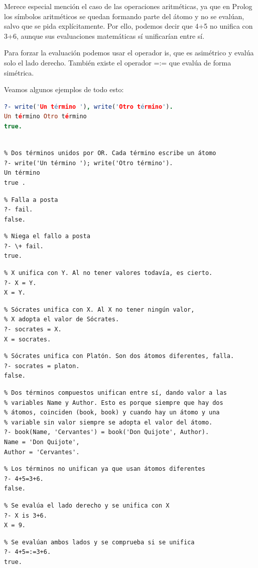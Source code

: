 \documentclass[openright,twoside,12pt]{book}
\begin{document}
Merece especial mención el caso de las operaciones aritméticas, ya que en Prolog los símbolos aritméticos se quedan formando parte del átomo y no se evalúan, salvo que se pida explícitamente. Por ello, podemos decir que 4+5 no unifica con 3+6, aunque sus evaluaciones matemáticas sí unificarían entre sí.

Para forzar la evaluación podemos usar el operador is, que es asimétrico y evalúa solo el lado derecho. También existe el operador =:= que evalúa de forma simétrica.

Veamos algunos ejemplos de todo esto:

\begin{lstlisting}[language=Prolog]
% Dos términos unidos por AND. Cada término escribe un átomo
?- write('Un término '), write('Otro término').
Un término Otro término
true.
\end{lstlisting}
\begin{lstlisting}

% Dos términos unidos por OR. Cada término escribe un átomo
?- write('Un término '); write('Otro término').
Un término 
true .

\end{lstlisting}
\begin{lstlisting}
% Falla a posta
?- fail.
false.
\end{lstlisting}
\begin{lstlisting}
% Niega el fallo a posta
?- \+ fail.
true.
\end{lstlisting}
\begin{lstlisting}
% X unifica con Y. Al no tener valores todavía, es cierto.
?- X = Y.
X = Y.
\end{lstlisting}
\begin{lstlisting}
% Sócrates unifica con X. Al X no tener ningún valor, 
% X adopta el valor de Sócrates. 
?- socrates = X.
X = socrates.
\end{lstlisting}
\begin{lstlisting}
% Sócrates unifica con Platón. Son dos átomos diferentes, falla.
?- socrates = platon.
false.
\end{lstlisting}
\begin{lstlisting}
% Dos términos compuestos unifican entre sí, dando valor a las
% variables Name y Author. Esto es porque siempre que hay dos
% átomos, coinciden (book, book) y cuando hay un átomo y una 
% variable sin valor siempre se adopta el valor del átomo.
?- book(Name, 'Cervantes') = book('Don Quijote', Author).
Name = 'Don Quijote',
Author = 'Cervantes'.
\end{lstlisting}
\begin{lstlisting}
% Los términos no unifican ya que usan átomos diferentes
?- 4+5=3+6.
false.
\end{lstlisting}
\begin{lstlisting}
% Se evalúa el lado derecho y se unifica con X
?- X is 3+6.
X = 9.
\end{lstlisting}
\begin{lstlisting}
% Se evalúan ambos lados y se comprueba si se unifica
?- 4+5=:=3+6.
true. 
\end{lstlisting}
\end{document}
